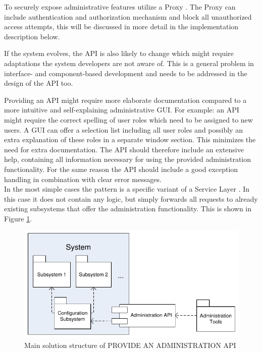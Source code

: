 To securely expose administrative features utilize a {\sc Proxy} \cite{Buschmann1996}. The {\sc Proxy} can include authentication and authorization mechanism and block all unauthorized access attempts, this will be discussed in more detail in the implementation description below.

If the system evolves, the API is also likely to change which might require adaptations the system developers are not aware of. This is a general problem in interface- and component-based development and needs to be addressed in the design of the API too. 

Providing an API might require more elaborate documentation compared to a more intuitive and self-explaining administrative GUI. For example: an API might require the correct spelling of user roles which need to be assigned to new users. A GUI can offer a selection list including all user roles and possibly an extra explanation of these roles in a separate window section. %
This minimizes the need for extra documentation. The API should therefore include an extensive help, containing all information necessary for using the provided administration functionality. For the same reason the API should include a good exception handling in combination with clear error messages. \\


In the most simple cases the pattern is a specific variant of a {\sc Service Layer} \cite{Fowler:2002:PEA:579257}. In this case it does not contain any logic, but simply forwards all requests to already existing subsystems that offer the administration functionality. This is shown in Figure \ref{fig:provideAPIDiagram-01}.  

\begin{figure}[h]
\centering
\includegraphics{patterns/provideAPIDiagram-01.pdf}
\caption{Main solution structure of PROVIDE AN ADMINISTRATION API}
\label{fig:provideAPIDiagram-01}
\end{figure}

